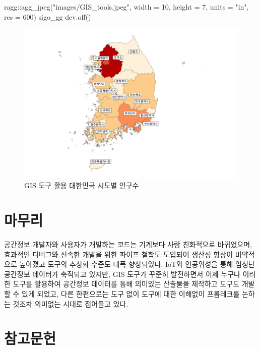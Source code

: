 \documentclass[
  a4paper,showtrims,openright,hidelinks]{oblivoir}
\newenvironment{Shaded}{\begin{snugshade}}{\end{snugshade}}
\newcommand{\AttributeTok}[1]{\textcolor[rgb]{0.40,0.45,0.13}{#1}}
\newcommand{\DecValTok}[1]{\textcolor[rgb]{0.68,0.00,0.00}{#1}}
\newcommand{\FunctionTok}[1]{\textcolor[rgb]{0.28,0.35,0.67}{#1}}
\newcommand{\NormalTok}[1]{\textcolor[rgb]{0.00,0.23,0.31}{#1}}
\newcommand{\SpecialCharTok}[1]{\textcolor[rgb]{0.37,0.37,0.37}{#1}}
\newcommand{\StringTok}[1]{\textcolor[rgb]{0.13,0.47,0.30}{#1}}
\begin{document}
\begin{Shaded}
\begin{Highlighting}[]
\NormalTok{ragg}\SpecialCharTok{::}\FunctionTok{agg\_jpeg}\NormalTok{(}\StringTok{"images/GIS\_tools.jpeg"}\NormalTok{,}
               \AttributeTok{width =} \DecValTok{10}\NormalTok{, }\AttributeTok{height =} \DecValTok{7}\NormalTok{, }\AttributeTok{units =} \StringTok{"in"}\NormalTok{, }\AttributeTok{res =} \DecValTok{600}\NormalTok{)}
\NormalTok{sigo\_gg}
\FunctionTok{dev.off}\NormalTok{()}
\end{Highlighting}
\end{Shaded}

\begin{figure}

{\centering \includegraphics{images/GIS_tools.jpeg}

}

\caption{GIS 도구 활용 대한민국 시도별 인구수}

\end{figure}

\hypertarget{uxb9c8uxbb34uxb9ac}{%
\section{마무리}\label{uxb9c8uxbb34uxb9ac}}

공간정보 개발자와 사용자가 개발하는 코드는 기계보다 사람 친화적으로
바뀌었으며, 효과적인 디버그와 신속한 개발을 위한 파이프 철학도 도입되어
생산성 향상이 비약적으로 높아졌고 도구의 추상화 수준도 대폭 향상되었다.
IoT와 인공위성을 통해 엄청난 공간정보 데이터가 축적되고 있지만, GIS
도구가 꾸준히 발전하면서 이제 누구나 이러한 도구를 활용하여 공간정보
데이터를 통해 의미있는 산출물을 제작하고 도구도 개발할 수 있게 되었고,
다른 한편으로는 도구 없이 도구에 대한 이해없이 프롭테크를 논하는 것조차
의미없는 시대로 접어들고 있다.

\hypertarget{uxcc38uxace0uxbb38uxd5cc}{%
\section*{참고문헌}\label{uxcc38uxace0uxbb38uxd5cc}}

\printbibliography[heading=none]
\end{document}
